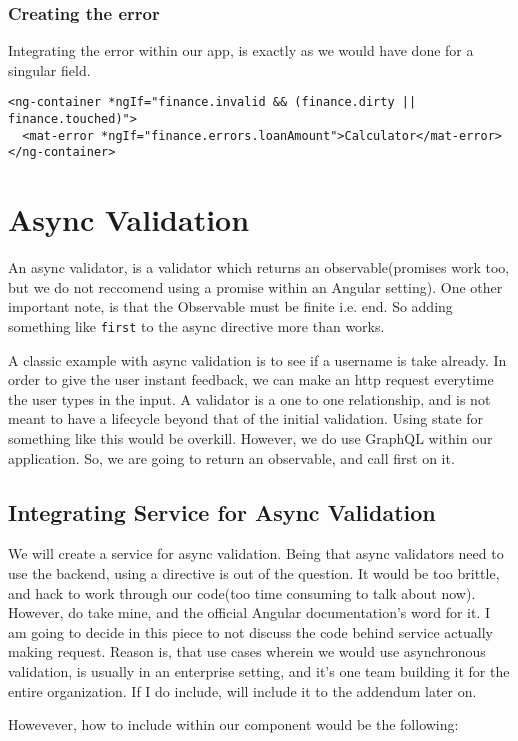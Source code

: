 \subsubsection{Creating the error}

Integrating the error within our app, is exactly as we would have done for a
singular field.

\begin{lstlisting}[caption=finance-calculator.component.html]
<ng-container *ngIf="finance.invalid && (finance.dirty || finance.touched)">
  <mat-error *ngIf="finance.errors.loanAmount">Calculator</mat-error>
</ng-container>
\end{lstlisting}

\section{Async Validation}
An async validator, is a validator which returns an observable(promises work too, but 
we do not reccomend using a promise within an Angular setting). One other important 
note, is that the Observable must be finite i.e. end. So adding something like 
\lstinline{first} to the async directive more than works. 

A classic example with async validation is to see if a username is take already. 
In order to give the user instant feedback, we can make an http request everytime
the user types in the input. A validator is a one to one relationship, and is not 
meant to have a lifecycle beyond that of the initial validation. Using state for 
something like this would be overkill. However, we do use GraphQL within our 
application. So, we are going to return an observable, and call first on it. 

\subsection{Integrating Service for Async Validation}
We will create a service for async validation. Being that async validators
need to use the backend, using a directive is out of the question. It would 
be too brittle, and hack to work through our code(too time consuming to talk 
about now). However, do take mine, and the official Angular documentation's 
word for it. I am going to decide in this piece to not discuss the code 
behind service actually making request. Reason is, that use cases wherein 
we would use asynchronous validation, is usually in an enterprise setting, 
and it's one team building it for the entire organization. If I do include, 
will include it to the addendum later on. 

Howevever, how to include within our component would be the following: 

\begin{lstlisting}
  
\end{lstlisting}
